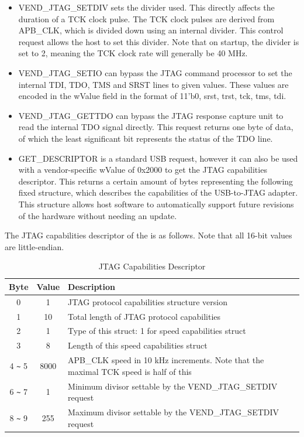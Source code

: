 \documentclass[main\_\_EN.tex]{subfiles}
\begin{document}
\begin{itemize}
\item VEND\_JTAG\_SETDIV sets the divider used. This directly affects the duration of a TCK clock pulse. The TCK clock pulses are derived from APB\_CLK, which is divided down using an internal divider. This control request allows the host to set this divider. Note that on startup, the divider is set to 2, meaning the TCK clock rate will generally be 40 MHz.

\item VEND\_JTAG\_SETIO can bypass the JTAG command processor to set the internal TDI, TDO, TMS and SRST lines to given values. These values are encoded in the wValue field in the format of {11'b0, srst, trst, tck, tms, tdi}.

\item VEND\_JTAG\_GETTDO can bypass the JTAG response capture unit to read the internal TDO signal directly. This request returns one byte of data, of which the least significant bit represents the status of the TDO line.

\item GET\_DESCRIPTOR is a standard USB request, however it can also be used with a vendor-specific wValue of 0x{}2000 to get the JTAG capabilities descriptor. This returns a certain amount of bytes representing the following fixed structure, which describes the capabilities of the USB-to-JTAG adapter. This structure allows host software to automatically support future revisions of the hardware without needing an update.
\end{itemize}


The JTAG capabilities descriptor of the \chipname{} is as follows. Note that all 16-bit values are little-endian.

\begin{table}[H]
    \centering
    \caption{JTAG Capabilities Descriptor}
    \label{tab:usbserialjtag-capabilities-descriptor}
    \begin{tabular}{ |c|c|l| }
    \hline
        \rowcolor{lightgray}
        \textbf{Byte} & \textbf{Value} & \textbf{Description} \\\hline

        0 &    1 &     JTAG protocol capabilities structure version \\\hline
        1 &    10 &     Total length of JTAG protocol capabilities \\\hline
        2 &    1 &     Type of this struct: 1 for speed capabilities struct \\\hline
        3 &    8 &     Length of this speed capabilities struct \\\hline
        4 \verb+~+ 5 &  8000 &  APB\_CLK speed in 10 kHz increments. Note that the maximal TCK speed is half of this \\\hline
        6 \verb+~+ 7 &  1 &     Minimum divisor  settable by the  VEND\_JTAG\_SETDIV request \\\hline
        8 \verb+~+ 9 &  255 &   Maximum divisor  settable by the  VEND\_JTAG\_SETDIV request \\\hline
    \end{tabular}
\end{table}
\end{document}

